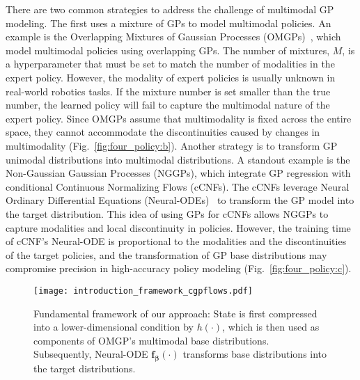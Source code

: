 \documentclass[sn-mathphys-num]{sn-jnl}
\begin{document}
There are two common strategies to address the challenge of multimodal GP modeling.
The first uses a mixture of GPs to model multimodal policies.
An example is the Overlapping Mixtures of Gaussian Processes (OMGPs)~\cite{lazaro2012overlapping}, which model multimodal policies using overlapping GPs. The number of mixtures, $M$, is a hyperparameter that must be set to match the number of modalities in the expert policy.
However, the modality of expert policies is usually unknown in real-world robotics tasks.
If the mixture number is set smaller than the true number, the learned policy will fail to capture the multimodal nature of the expert policy.
Since OMGPs assume that multimodality is fixed across the entire space, they cannot accommodate the discontinuities caused by changes in multimodality (Fig.~\ref{fig:four_policy:b}).
Another strategy is to transform GP unimodal distributions into multimodal distributions.
A standout example is the Non-Gaussian Gaussian Processes (NGGPs)\cite{sendera2021non}, which integrate GP regression with conditional Continuous Normalizing Flows (cCNFs)\cite{papamakarios2021normalizing}. The cCNFs leverage Neural Ordinary Differential Equations (Neural-ODEs)~\cite{chen2018neural} to transform the GP model into the target distribution.
This idea of using GPs for cCNFs allows NGGPs to capture modalities and local discontinuity in policies.
However, the training time of cCNF's Neural-ODE is proportional to the modalities and the discontinuities of the target policies, and the transformation of GP base distributions may compromise precision in high-accuracy policy modeling (Fig.~\ref{fig:four_policy:c}).

\begin{figure*}[!t]
    \centering
    \texttt{[image: introduction\_framework\_cgpflows.pdf]}
    \caption{Fundamental framework of our approach: State is first compressed into a lower-dimensional condition by $h(\cdot)$, which is then used as components of OMGP's multimodal base distributions. Subsequently, Neural-ODE $\mathbf{f}_{\boldsymbol{\beta}}(\cdot)$ transforms base distributions into the target distributions.}
\label{fig:demo:transformation}
\end{figure*}
\end{document}
